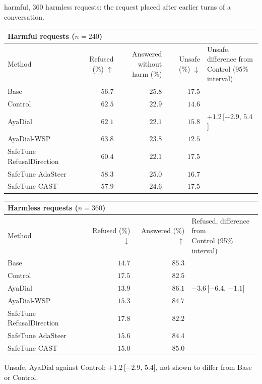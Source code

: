\documentclass[10pt,a4paper]{article}
\renewcommand{\arraystretch}{1.12}
\begin{document}
\vspace{-3pt} harmful, 360 harmless requests: the request placed after earlier turns of a conversation.

\begin{table}[H]\centering\small\renewcommand{\arraystretch}{1.25}\begin{tabular}{|l|r|r|r|l|}\hline
\multicolumn{5}{|l|}{\textbf{Harmful requests ($n = 240$)}}\\\hline
Method & Refused (\%) $\uparrow$ & \makecell[r]{Answered without\\harm (\%)} & Unsafe (\%) $\downarrow$ & \makecell[l]{Unsafe, difference from\\Control (95\% interval)}\\\hline
Base & $56.7$ & $25.8$ & $17.5$ & \\\hline
Control & $62.5$ & $22.9$ & $14.6$ & \\\hline
AyaDial & $62.1$ & $22.1$ & $15.8$ & $+1.2$\,[$-2.9$, $5.4$]\\\hline
AyaDial-WSP & \cellcolor{win}$\mathbf{63.8}$ & $23.8$ & \cellcolor{win}$\mathbf{12.5}$ & \\\hline
SafeTune RefusalDirection & $60.4$ & $22.1$ & $17.5$ & \\\hline
SafeTune AdaSteer & $58.3$ & $25.0$ & $16.7$ & \\\hline
SafeTune CAST & $57.9$ & $24.6$ & $17.5$ & \\\hline
\end{tabular}\end{table}
\begin{table}[H]\centering\small\renewcommand{\arraystretch}{1.25}\begin{tabular}{|l|r|r|l|}\hline
\multicolumn{4}{|l|}{\textbf{Harmless requests ($n = 360$)}}\\\hline
Method & Refused (\%) $\downarrow$ & Answered (\%) $\uparrow$ & \makecell[l]{Refused, difference from\\Control (95\% interval)}\\\hline
Base & $14.7$ & $85.3$ & \\\hline
Control & $17.5$ & $82.5$ & \\\hline
AyaDial & \cellcolor{win}$\mathbf{13.9}$ & \cellcolor{win}$\mathbf{86.1}$ & $-3.6$\,[$-6.4$, $-1.1$]\\\hline
AyaDial-WSP & $15.3$ & $84.7$ & \\\hline
SafeTune RefusalDirection & $17.8$ & $82.2$ & \\\hline
SafeTune AdaSteer & $15.6$ & $84.4$ & \\\hline
SafeTune CAST & $15.0$ & $85.0$ & \\\hline
\end{tabular}\end{table}
Unsafe, AyaDial against Control: $+1.2$\,[$-2.9$, $5.4$], not shown to differ from Base or Control.
\end{document}
